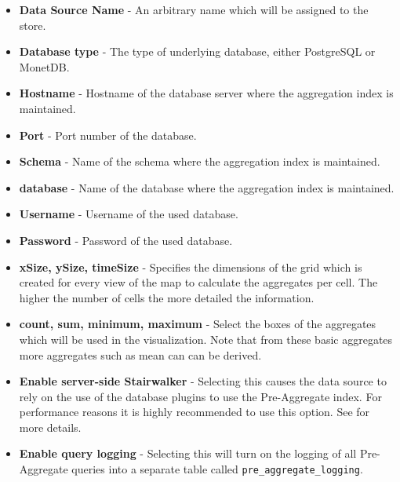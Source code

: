 \begin{itemize}\label{list:manditory}
	\item \textbf{Data Source Name} - An arbitrary name which will be assigned to the store.
	\item \textbf{Database type} - The type of underlying database, either PostgreSQL or MonetDB.
	\item \textbf{Hostname} - Hostname of the database server where the aggregation index is maintained.
	\item \textbf{Port} - Port number of the database.
	\item \textbf{Schema} - Name of the schema where the aggregation index is maintained.
	\item \textbf{database} - Name of the database where the aggregation index is maintained.
	\item \textbf{Username} - Username of the used database.
	\item \textbf{Password} - Password of the used database.
	\item \textbf{xSize, ySize, timeSize} - Specifies the dimensions of the grid which is created for every view of the map to calculate the aggregates per cell. The higher the number of cells the more detailed the information. \\
	\item \textbf{count, sum, minimum, maximum} - Select the boxes of the
	aggregates which will be used in the visualization. Note that from these basic aggregates more aggregates such as mean can can be derived.
	\item \textbf{Enable server-side Stairwalker} - Selecting this causes the data source to rely on the use of the database plugins to use the Pre-Aggregate index. For performance reasons it is highly recommended to use this option. See  for more details.
	\item \textbf{Enable query logging} - Selecting this will turn on the logging of all Pre-Aggregate queries into a separate table called \lstinline|pre_aggregate_logging|.
\end{itemize}
